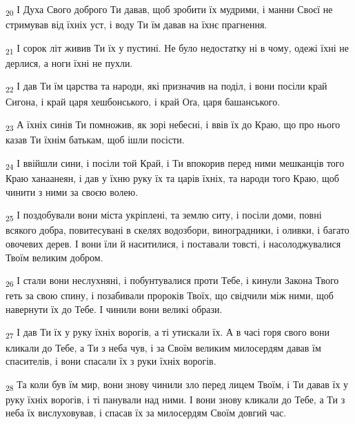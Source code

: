 \begin{tcolorbox}
\textsubscript{20} І Духа Свого доброго Ти давав, щоб зробити їх мудрими, і манни Своєї не стримував від їхніх уст, і воду Ти їм давав на їхнє прагнення.
\end{tcolorbox}
\begin{tcolorbox}
\textsubscript{21} І сорок літ живив Ти їх у пустині. Не було недостатку ні в чому, одежі їхні не дерлися, а ноги їхні не пухли.
\end{tcolorbox}
\begin{tcolorbox}
\textsubscript{22} І дав Ти їм царства та народи, які призначив на поділ, і вони посіли край Сигона, і край царя хешбонського, і край Оґа, царя башанського.
\end{tcolorbox}
\begin{tcolorbox}
\textsubscript{23} А їхніх синів Ти помножив, як зорі небесні, і ввів їх до Краю, що про нього казав Ти їхнім батькам, щоб ішли посісти.
\end{tcolorbox}
\begin{tcolorbox}
\textsubscript{24} І ввійшли сини, і посіли той Край, і Ти впокорив перед ними мешканців того Краю ханаанеян, і дав у їхню руку їх та царів їхніх, та народи того Краю, щоб чинити з ними за своєю волею.
\end{tcolorbox}
\begin{tcolorbox}
\textsubscript{25} І поздобували вони міста укріплені, та землю ситу, і посіли доми, повні всякого добра, повитесувані в скелях водозбори, виноградники, і оливки, і багато овочевих дерев. І вони їли й наситилися, і поставали товсті, і насолоджувалися Твоїм великим добром.
\end{tcolorbox}
\begin{tcolorbox}
\textsubscript{26} І стали вони неслухняні, і побунтувалися проти Тебе, і кинули Закона Твого геть за свою спину, і позабивали пророків Твоїх, що свідчили між ними, щоб навернути їх до Тебе. І чинили вони великі образи.
\end{tcolorbox}
\begin{tcolorbox}
\textsubscript{27} І дав Ти їх у руку їхніх ворогів, а ті утискали їх. А в часі горя свого вони кликали до Тебе, а Ти з неба чув, і за Своїм великим милосердям давав їм спасителів, і вони спасали їх з руки їхніх ворогів.
\end{tcolorbox}
\begin{tcolorbox}
\textsubscript{28} Та коли був їм мир, вони знову чинили зло перед лицем Твоїм, і Ти давав їх у руку їхніх ворогів, і ті панували над ними. І вони знову кликали до Тебе, а Ти з неба їх вислуховував, і спасав їх за милосердям Своїм довгий час.
\end{tcolorbox}
